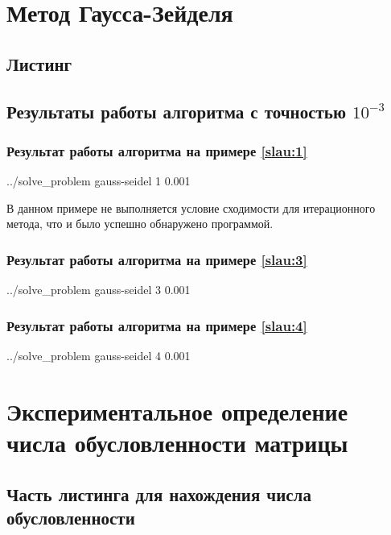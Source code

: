 \documentclass[a4paper]{article}
\begin{document}
\section{Метод Гаусса-Зейделя}

\subsection{Листинг}


\subsection{Результаты работы алгоритма с точностью $10^{-3}$}

\subsubsection{Результат работы алгоритма на примере \eqref{slau:1}}
\bash[stdout]
../solve_problem gauss-seidel 1 0.001
\END
\newline

В данном примере не выполняется условие сходимости для итерационного метода, что и было успешно обнаружено программой.

\subsubsection{Результат работы алгоритма на примере \eqref{slau:3}}
\bash[stdout]
../solve_problem gauss-seidel 3 0.001
\END

\subsubsection{Результат работы алгоритма на примере \eqref{slau:4}}
\bash[stdout]
../solve_problem gauss-seidel 4 0.001
\END

\section{Экспериментальное определение числа обусловленности матрицы}

\subsection{Часть листинга для нахождения числа обусловленности}

\end{document}
